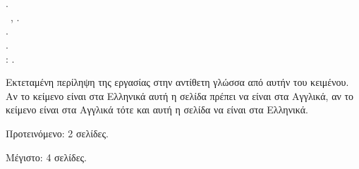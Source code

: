 \chapter*{\cseextabstract}
\addstarredchapter{\cseextabstract} %

\makeatletter
\authorBilingual.\\
\cseextabstracttype\ifPhD\else\ \cseextabstractcs\fi, \dateBilingual.\\
\cseextabstractdpt.\\
\titleBilingual.\\
\cseextabstractsup: \advisorBilingual.
\makeatother

\bigskip
\bigskip

\noindent Εκτεταμένη περίληψη της εργασίας στην αντίθετη γλώσσα από αυτήν του κειμένου.
Αν το κείμενο είναι στα Ελληνικά αυτή η σελίδα πρέπει να είναι στα Αγγλικά, αν το κείμενο είναι στα Αγγλικά τότε και αυτή η σελίδα να είναι στα Ελληνικά.

\bigskip

\noindent Προτεινόμενο: 2 σελίδες.

\noindent Μέγιστο: 4 σελίδες.